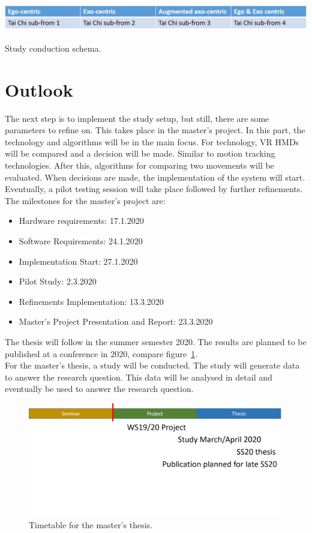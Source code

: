 \begin{table}
	\centering
	\includegraphics[width=1.0\textwidth]{img/studySetting.png}
	\caption{Study conduction schema.}
	\label{tbl:studySetting}
\end{table}

\section{Outlook}
The next step is to implement the study setup, but still, there are some parameters to refine on. This takes place in the master's project. In this part, the technology and algorithms will be in the main focus. For technology, VR HMDs will be compared and a decision will be made. Similar to motion tracking technologies. After this, algorithms for comparing two movements will be evaluated. When decisions are made, the implementation of the system will start. Eventually, a pilot testing session will take place followed by further refinements.
The milestones for the master's project are:
\begin{itemize}
	\item Hardware requirements: 17.1.2020
	\item Software Requirements: 24.1.2020
	\item Implementation Start: 27.1.2020
	\item Pilot Study: 2.3.2020
	\item Refinements Implementation: 13.3.2020
	\item Master’s Project Presentation and Report: 23.3.2020
\end{itemize}
The thesis will follow in the summer semester 2020. The results are planned to be published at a conference in 2020, compare figure~\ref{fig:outlook}.\\
For the master's thesis, a study will be conducted. The study will generate data to answer the research question. This data will be analysed in detail and eventually be used to answer the research question.

\begin{figure}
	\centering
	\includegraphics[width=1.0\textwidth]{img/outlook.png}
	\caption{Timetable for the master's thesis.}
	\label{fig:outlook}
\end{figure}


